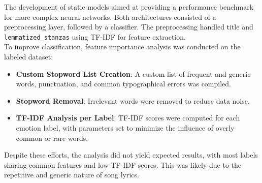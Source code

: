 

The development of static models aimed at providing a performance benchmark for
more complex neural networks.
Both architectures consisted of a preprocessing layer, followed by a classifier.
The preprocessing handled title and \texttt{lemmatized\_stanzas} using TF-IDF for feature
extraction.\\

To improve classification, feature importance analysis was conducted on the
labeled dataset:
\begin{itemize}
    \item \textbf{Custom Stopword List Creation}: A custom list of frequent and
    generic words, punctuation, and common typographical errors was compiled.
    \item \textbf{Stopword Removal}: Irrelevant words were removed to reduce data
    noise.
    \item \textbf{TF-IDF Analysis per Label}: TF-IDF scores were computed for
    each emotion label, with parameters set to minimize the influence of overly
    common or rare words.
\end{itemize}
Despite these efforts, the analysis did not yield expected results, with most
labels sharing common features and low TF-IDF scores.
This was likely due to the repetitive and generic nature of song lyrics.\\

